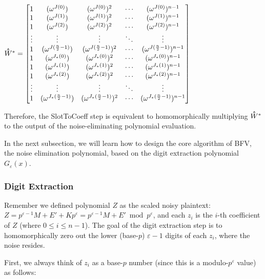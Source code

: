 $\hathat{W}^* = \begin{bmatrix}
1 & (\omega^{J(0)}) & (\omega^{J(0)})^2 & \cdots & (\omega^{J(0)})^{n-1}\\
1 & (\omega^{J(1)}) & (\omega^{J(1)})^2 & \cdots & (\omega^{J(1)})^{n-1}\\
1 & (\omega^{J(2)}) & (\omega^{J(2)})^2 & \cdots & (\omega^{J(2)})^{n-1}\\
\vdots & \vdots & \vdots & \ddots & \vdots \\
1 & (\omega^{J(\frac{n}{2}-1)}) & (\omega^{J(\frac{n}{2}-1)})^2 & \cdots & (\omega^{J(\frac{n}{2}-1)})^{n-1}\\
1 & (\omega^{J_*(0)}) & (\omega^{J_*(0)})^2 & \cdots & (\omega^{J_*(0)})^{n-1}\\
1 & (\omega^{J_*(1)}) & (\omega^{J_*(1)})^2 & \cdots & (\omega^{J_*(1)})^{n-1}\\
1 & (\omega^{J_*(2)}) & (\omega^{J_*(2)})^2 & \cdots & (\omega^{J_*(2)})^{n-1}\\
\vdots & \vdots & \vdots & \ddots & \vdots \\
1 & (\omega^{J_*(\frac{n}{2}-1)}) & (\omega^{J_*(\frac{n}{2}-1)})^2 & \cdots & (\omega^{J_*(\frac{n}{2}-1)})^{n-1}\\
\end{bmatrix}$

Therefore, the \textsf{SlotToCoeff} step is equivalent to homomorphically multiplying $\hathat{W}^*$ to the output of the noise-eliminating polynomial evaluation.  

In the next subsection, we will learn how to design the core algorithm of BFV, the noise elimination polynomial, based on the digit extraction polynomial $G_\varepsilon(x)$. 


\subsubsection{Digit Extraction}
\label{subsubsec:bfv-bootstrapping-digit-extraction}


Remember we defined polynomial $Z$ as the scaled noisy plaintext: $Z = p^{\varepsilon-1}M + E' + Kp^\varepsilon = p^{\varepsilon-1}M + E' \bmod p^\varepsilon$, and each $z_i$ is the $i$-th coefficient of $Z$ (where $0 \leq i \leq n -1$). The goal of the digit extraction step is to homomorphically zero out the lower (base-$p$) $\varepsilon-1$  digits of each $z_i$, where the noise resides.%

First, we always think of $z_i$ as a base-$p$ number (since this is a modulo-$p^\varepsilon$ value) as follows:

